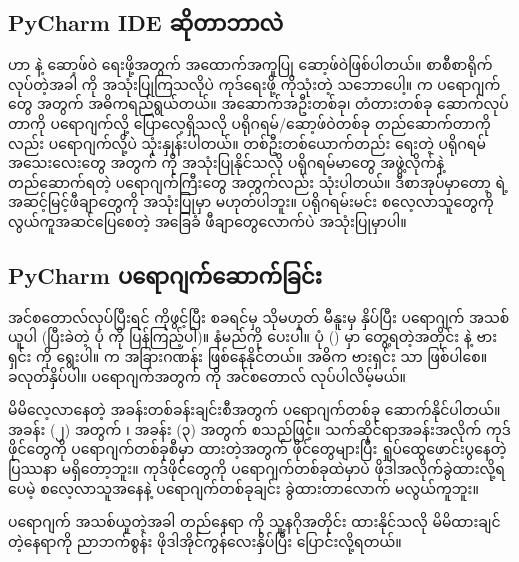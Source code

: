 \subsection*{PyCharm IDE ဆိုတာဘာလဲ}
 ဟာ  နဲ့ ဆော့ဖ်ဝဲ  ရေးဖို့အတွက် အထောက်အကူပြု  ဆော့ဖ်ဝဲဖြစ်ပါတယ်။ စာစီစာရိုက်လုပ်တဲ့အခါ  ကို အသုံးပြုကြသလိုပဲ  ကုဒ်ရေးဖို့  ကိုသုံးတဲ့ သဘောပေါ့။  က  ပရောဂျက်တွေ အတွက် အဓိကရည်ရွယ်တယ်။ အဆောက်အဦးတစ်ခု၊ တံတားတစ်ခု ဆောက်လုပ်တာကို ပရောဂျက်လို့ ပြောလေ့ရှိသလို ပရိုဂရမ်/ဆော့ဖ်ဝဲတစ်ခု တည်ဆောက်တာကိုလည်း ပရောဂျက်လို့ပဲ သုံးနှုန်းပါတယ်။ တစ်ဦးတစ်ယောက်တည်း ရေးတဲ့ ပရိုဂရမ်အသေးလေးတွေ အတွက်  ကို အသုံးပြုနိုင်သလို ပရိုဂရမ်မာတွေ အဖွဲ့လိုက်နဲ့ တည်ဆောက်ရတဲ့ ပရောဂျက်ကြီးတွေ အတွက်လည်း သုံးပါတယ်။ ဒီစာအုပ်မှာတော့  ရဲ့ အဆင့်မြင့်ဖီချာတွေကို အသုံးပြုမှာ မဟုတ်ပါဘူး။ ပရိုဂရမ်းမင်း စလေ့လာသူတွေကို လွယ်ကူအဆင်ပြေစေတဲ့ အခြေခံ ဖီချာတွေလောက်ပဲ အသုံးပြုမှာပါ။ 

\clearpage

\subsection*{PyCharm ပရောဂျက်ဆောက်ခြင်း}
အင်စတောလ်လုပ်ပြီးရင်  ကိုဖွင့်ပြီး  စခရင်မှ သိုမဟုတ်  မီနူးမှ  နှိပ်ပြီး ပရောဂျက် အသစ်ယူပါ (ပြီးခဲတဲ့ ပုံ \fRefNo{\ref{fig:pychmwlcm}} ကို ပြန်ကြည့်ပါ)။ နံမည်ကို  ပေးပါ။ ပုံ (\fRefNo{\ref{fig:new_proj}}) မှာ တွေ့ရတဲ့အတိုင်း  နဲ့  ဗားရှင်း  ကို ရွေးပါ။  က အခြားဂဏန်း ဖြစ်နေနိုင်တယ်။ အဓိက ဗားရှင်း  သာ ဖြစ်ပါစေ။  ခလုတ်နှိပ်ပါ။ ပရောဂျက်အတွက်  ကို အင်စတောလ် လုပ်ပါလိမ့်မယ်။

မိမိလေ့လာနေတဲ့ အခန်းတစ်ခန်းချင်းစီအတွက် ပရောဂျက်တစ်ခု ဆောက်နိုင်ပါတယ်။ အခန်း (၂) အတွက်  ၊ အခန်း (၃) အတွက်  စသည်ဖြင့်။  သက်ဆိုင်ရာအခန်းအလိုက် ကုဒ်ဖိုင်တွေကို ပရောဂျက်တစ်ခုစီမှာ ထားတဲ့အတွက် ဖိုင်တွေများပြီး ရှုပ်ထွေဖောင်းပွနေတဲ့ ပြဿနာ မရှိတော့ဘူး။ ကုဒ်ဖိုင်တွေကို ပရောဂျက်တစ်ခုထဲမှာပဲ ဖိုဒါအလိုက်ခွဲထားလို့ရပေမဲ့ စလေ့လာသူအနေနဲ့ ပရောဂျက်တစ်ခုချင်း ခွဲထားတာလောက် မလွယ်ကူဘူး။

ပရောဂျက် အသစ်ယူတဲ့အခါ တည်နေရာ  ကို သူ့နဂိုအတိုင်း ထားနိုင်သလို မိမိထားချင်တဲ့နေရာကို ညာဘက်စွန်း ဖိုဒါအိုင်ကွန်လေးနှိပ်ပြီး ပြောင်းလို့ရတယ်။

